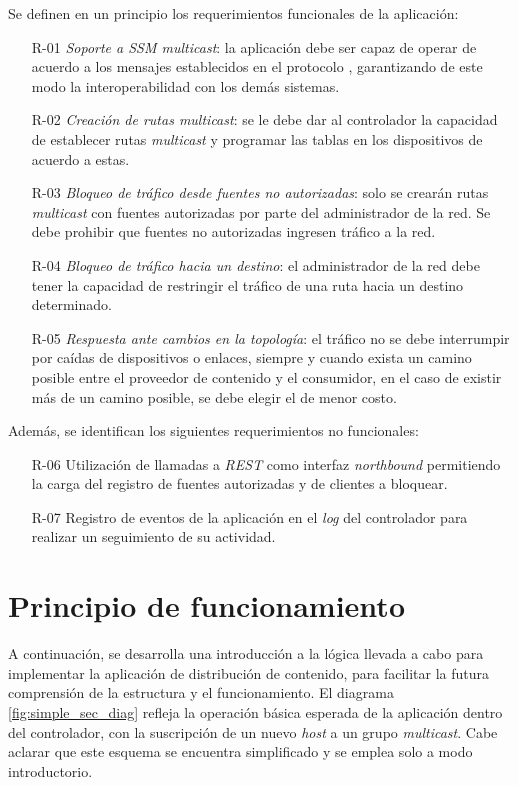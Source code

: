 Se definen en un principio los requerimientos funcionales de la aplicación:
\begin{itemize}
	\item [R-01] \textit{Soporte a SSM \textit{multicast}}: la aplicación debe ser capaz de operar de acuerdo a los mensajes establecidos en el protocolo \parencite{ssmprotocol}, garantizando de este modo la interoperabilidad con los demás sistemas. %
	\item [R-02] \textit{Creación de rutas \textit{multicast}}: se le debe dar al controlador la capacidad de establecer rutas \textit{multicast} y programar las tablas en los dispositivos de acuerdo a estas.
	\item [R-03] \textit{Bloqueo de tráfico desde fuentes no autorizadas}: solo se crearán rutas \textit{multicast} con fuentes autorizadas por parte del administrador de la red. Se debe prohibir que fuentes no autorizadas ingresen tráfico a la red.
	\item [R-04] \textit{Bloqueo de tráfico hacia un destino}: el administrador de la red debe tener la capacidad de restringir el tráfico de una ruta hacia un destino determinado.
	\item [R-05] \textit{Respuesta ante cambios en la topología}: el tráfico no se debe interrumpir por caídas de dispositivos o enlaces, siempre y cuando exista un camino posible entre el proveedor de contenido y el consumidor, en el caso de existir más de un camino posible, se debe elegir el de menor costo.
\end{itemize}

Además, se identifican los siguientes requerimientos no funcionales:
\begin{itemize}
	\item [R-06] Utilización de llamadas a \textit{REST} como interfaz \textit{northbound} permitiendo la carga del registro de fuentes autorizadas y de clientes a bloquear.
	\item [R-07] Registro de eventos de la aplicación en el \textit{log} del controlador para realizar un seguimiento de su actividad.
\end{itemize}


\section{Principio de funcionamiento}
A continuación, se desarrolla una introducción a la lógica llevada a cabo para implementar la aplicación de distribución de contenido, para facilitar la futura comprensión de la estructura y el funcionamiento.
El diagrama \ref{fig:simple_sec_diag} refleja la operación básica esperada de la aplicación dentro del controlador, con la suscripción de un nuevo \textit{host} a un grupo \textit{multicast}. Cabe aclarar que este esquema se encuentra simplificado y se emplea solo a modo introductorio. 

